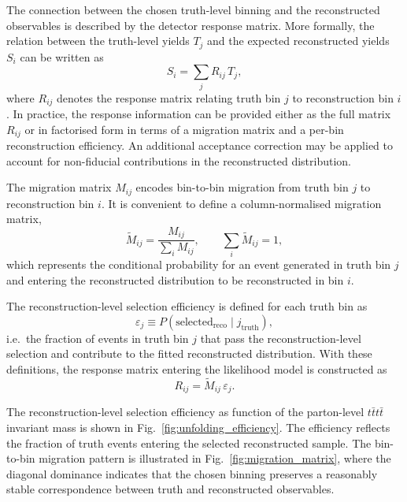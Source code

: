 The connection between the chosen truth-level binning and the reconstructed observables is described by the detector response matrix. 
More formally, the relation between the truth-level yields $T_j$ and the expected reconstructed yields $S_i$ can be written as
\begin{equation}
S_i = \sum_{j} R_{ij}\,T_j ,
\end{equation}
where $R_{ij}$ denotes the response matrix relating truth bin $j$ to reconstruction bin $i$. 
In practice, the response information can be provided either as the full matrix $R_{ij}$ or in factorised form in terms of a migration matrix and a per-bin reconstruction efficiency. 
An additional acceptance correction may be applied to account for non-fiducial contributions in the reconstructed distribution.

The migration matrix $M_{ij}$ encodes bin-to-bin migration from truth bin $j$ to reconstruction bin $i$. 
It is convenient to define a column-normalised migration matrix,
\begin{equation}
\widetilde{M}_{ij} = \frac{M_{ij}}{\sum_{i} M_{ij}},
\qquad \sum_i \widetilde{M}_{ij}=1,
\end{equation}
which represents the conditional probability for an event generated in truth bin $j$ and entering the reconstructed distribution to be reconstructed in bin $i$.

The reconstruction-level selection efficiency is defined for each truth bin as
\begin{equation}
\varepsilon_j \equiv P(\mathrm{selected}_{\mathrm{reco}} \mid j_{\mathrm{truth}}),
\end{equation}
i.e.\ the fraction of events in truth bin $j$ that pass the reconstruction-level selection and contribute to the fitted reconstructed distribution. 
With these definitions, the response matrix entering the likelihood model is constructed as
\begin{equation}
R_{ij} = \widetilde{M}_{ij}\,\varepsilon_j .
\end{equation}

The reconstruction-level selection efficiency as function of the parton-level $t\bar{t}t\bar{t}$ invariant mass is shown in Fig.~\ref{fig:unfolding_efficiency}. 
The efficiency reflects the fraction of truth events entering the selected reconstructed sample. 
The bin-to-bin migration pattern is illustrated in Fig.~\ref{fig:migration_matrix}, where the diagonal dominance indicates that the chosen binning preserves a reasonably stable correspondence between truth and reconstructed observables.

